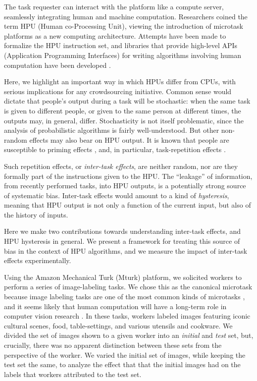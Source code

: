 \documentclass[12pt]{article}
\begin{document}
The task requester can interact with the platform like a compute server, 
seamlessly 
integrating human and machine computation.  Researchers coined the 
term HPU (Human co-Processing Unit), viewing the introduction 
of microtask platforms as a new computing architecture\cite{5543192}.  
Attempts have been made to formalize the HPU instruction set, and libraries 
that provide high-level APIs (Application Programming Interfaces) for writing 
algorithms involving human computation have been developed \cite{little2010turkit,minder2011crowdlang,minder2012crowdlang,kittur2011crowdforge}.

Here, we highlight an important way in which HPUs differ from CPUs, with 
serious implications for any crowdsourcing initiative.  Common sense would 
dictate that people's output during a task will be stochastic: when the same
task is given to different people, or given to the same person at different 
times,
the outputs may, in general, differ.  Stochasticity is not itself problematic,
since the analysis of probabilistic algorithms is fairly 
well-understood. But other non-random effects may also bear on HPU output. 
It is known that people are susceptible to priming effects 
\cite{BJOP1796,No2007,beller1971priming}, and, in particular, task-repetition 
effects \cite{Gass1999549,sohn2001task}.  

Such repetition effects, or
\textit{inter-task effects}, are neither random, nor are they formally part 
of the instructions given to the HPU.  The ``leakage'' of information, 
from recently performed tasks, into HPU outputs, is a potentially strong 
source of systematic bias.
Inter-task effects would amount to a kind of \textit{hysteresis}, meaning 
that HPU output is not only a function of the current input, but also of the 
history of inputs.  

Here we make two contributions towards understanding inter-task effects,
and HPU hysteresis in general.  We present a framework for treating this 
source of bias in the context of HPU algorithms, and we measure the impact of
inter-task effects experimentally.

Using the  Amazon Mechanical Turk (Mturk) platform, we solicited workers to 
perform a series of image-labeling tasks.  We chose this as the canonical
microtask because image labeling tasks are one of the most common kinds of
microtasks
\cite{chandler2013breaking,Berinsky2012351,Finnerty2013,paolacci2010running}, 
and it seems likely that human computation will have a long-term role
in computer vision research \cite{5543192}.
In these tasks, workers labeled images featuring iconic cultural scenes,
food, table-settings, and various utensils and cookware. We divided the set of 
images shown to a given worker into an \textit{initial} and \textit{test} set, 
but, crucially, there was no apparent distinction between these sets from the
perspective of the worker.  We varied the initial set of images, while 
keeping the test set the same, to analyze the effect that that the initial 
images had on the labels that workers attributed to the test set.
\end{document}
